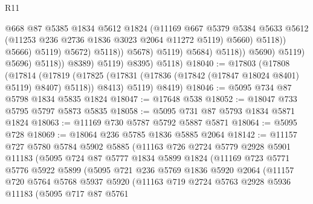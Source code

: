 \begin{lexlean}{R11}
\begin{coremodule}
                                              @668
                                              @87
                                              @5385
                                              @1834
                                              @5612
                                              @1824
                                              (@11169
                                                @667
                                                @5379
                                                @5384
                                                @5633
                                                @5612
                                                (@11253 @236 @2736 @1836 @3023 @2064 @11272 @5119)
                                                @5660)
                                              @5118))
                                          @5666)
                                        @5119)
                                      @5672)
                                    @5118))
                                @5678)
                              @5119)
                            @5684)
                          @5118))
                      @5690)
                    @5119)
                  @5696)
                @5118))
            @8389)
          @5119)
        @8395)
      @5118)
@18040 := @17803
    (@17808
      (@17814
        (@17819 (@17825 (@17831 (@17836 (@17842 (@17847 @18024 @8401) @5119) @8407) @5118)) @8413)
        @5119)
      @8419)
@18046 := @5095 @734 @87 @5798 @1834 @5835 @1824
@18047 := @17648 @538
@18052 := @18047 @733 @5795 @5797 @5873 @5835
@18058 := @5095 @731 @87 @5793 @1834 @5871 @1824
@18063 := @11169 @730 @5787 @5792 @5887 @5871
@18064 := @5095 @728
@18069 := @18064 @236 @5785 @1836 @5885 @2064
@18142 := @11157
    @727
    @5780
    @5784
    @5902
    @5885
    (@11163
      @726
      @2724
      @5779
      @2928
      @5901
      @11183
      (@5095
        @724
        @87
        @5777
        @1834
        @5899
        @1824
        (@11169
          @723
          @5771
          @5776
          @5922
          @5899
          (@5095
            @721
            @236
            @5769
            @1836
            @5920
            @2064
            (@11157
              @720
              @5764
              @5768
              @5937
              @5920
              (@11163
                @719
                @2724
                @5763
                @2928
                @5936
                @11183
                (@5095
                  @717
                  @87
                  @5761

\end{coremodule}
\end{lexlean}
